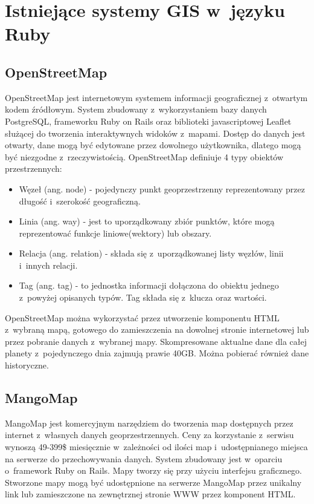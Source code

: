 \documentclass[printmode]{mgr}
\begin{document}
\section{Istniejące systemy GIS w~języku Ruby}

\subsection{OpenStreetMap}

  OpenStreetMap jest internetowym systemem informacji geograficznej z~otwartym kodem źródłowym. System zbudowany z~wykorzystaniem bazy danych PostgreSQL, frameworku Ruby on Rails oraz biblioteki javascriptowej Leaflet służącej do tworzenia interaktywnych widoków z~mapami. Dostęp do danych jest otwarty, dane mogą być edytowane przez dowolnego użytkownika, dlatego mogą być niezgodne z~rzeczywistością. OpenStreetMap definiuje 4 typy obiektów przestrzennych\cite{doc_osm}:
  \begin{itemize}
    \item Węzeł (ang. node) - pojedynczy punkt geoprzestrzenny reprezentowany przez długość i~szerokość geograficzną.
    \item Linia (ang. way) - jest to uporządkowany zbiór punktów, które mogą reprezentować funkcje liniowe(wektory) lub obszary.
    \item Relacja (ang. relation) - składa się z~uporządkowanej listy węzłów, linii i~innych relacji.
    \item Tag (ang. tag) - to jednostka informacji dołączona do obiektu jednego z~powyżej opisanych typów. Tag składa się z~klucza oraz wartości. 
  \end{itemize}

  OpenStreetMap można wykorzystać przez utworzenie komponentu HTML z~wybraną mapą, gotowego do zamieszczenia na dowolnej stronie internetowej lub przez pobranie danych z~wybranej mapy. Skompresowane aktualne dane dla całej planety z~pojedynczego dnia zajmują prawie 40GB. Można pobierać również dane historyczne.

\subsection{MangoMap}

  MangoMap jest komercyjnym narzędziem do tworzenia map dostępnych przez internet z~własnych danych geoprzestrzennych. Ceny za korzystanie z~serwisu wynoszą 49-399\$ miesięcznie w~zależności od ilości map i~udostępnianego miejsca na serwerze do przechowywania danych. System zbudowany jest w~oparciu o~framework Ruby on Rails. Mapy tworzy się przy użyciu interfejsu graficznego. Stworzone mapy mogą być udostępnione na serwerze MangoMap przez unikalny link lub zamieszczone na zewnętrznej stronie WWW przez komponent HTML\cite{doc_mango}.
\end{document}
